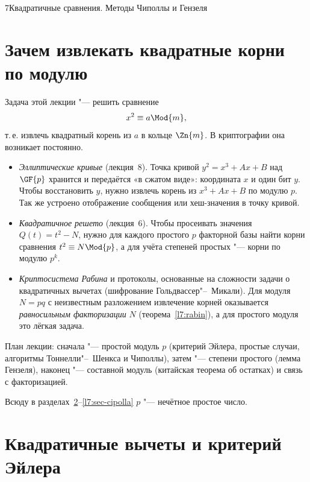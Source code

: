 \begin{lecture}{7}{Квадратичные сравнения. Методы Чиполлы и Гензеля}

\section{Зачем извлекать квадратные корни по модулю}

Задача этой лекции "--- решить сравнение
\[
  x^2 \equiv a \Mod{m},
\]
т.\,е. извлечь квадратный корень из $a$ в кольце $\Zn{m}$. В криптографии она возникает
постоянно.
\begin{itemize}
  \item \emph{Эллиптические кривые} (лекция~8). Точка кривой $y^2 = x^3 + Ax + B$ над $\GF{p}$
    хранится и передаётся «в сжатом виде»: координата $x$ и один бит $y$. Чтобы восстановить
    $y$, нужно извлечь корень из $x^3 + Ax + B$ по модулю $p$. Так же устроено отображение
    сообщения или хеш-значения в точку кривой.
  \item \emph{Квадратичное решето} (лекция~6). Чтобы просеивать значения $Q(t) = t^2 - N$,
    нужно для каждого простого $p$ факторной базы найти корни сравнения
    $t^2 \equiv N \Mod{p}$, а для учёта степеней простых "--- корни по модулю $p^k$.
  \item \emph{Криптосистема Рабина} и протоколы, основанные на сложности задачи о квадратичных
    вычетах (шифрование Гольдвассер"--~Микали). Для модуля $N = pq$ с неизвестным разложением
    извлечение корней оказывается \emph{равносильным факторизации} $N$
    (теорема~\ref{l7:rabin}), а для простого модуля это лёгкая задача.
\end{itemize}

План лекции: сначала "--- простой модуль $p$ (критерий Эйлера, простые случаи, алгоритмы
Тоннелли"--~Шенкса и Чиполлы), затем "--- степени простого (лемма Гензеля), наконец "---
составной модуль (китайская теорема об остатках) и связь с факторизацией.

Всюду в разделах~\ref{l7:sec-qr}--\ref{l7:sec-cipolla} $p$ "--- нечётное простое число.

\section{Квадратичные вычеты и критерий Эйлера}\label{l7:sec-qr}


\end{lecture}
